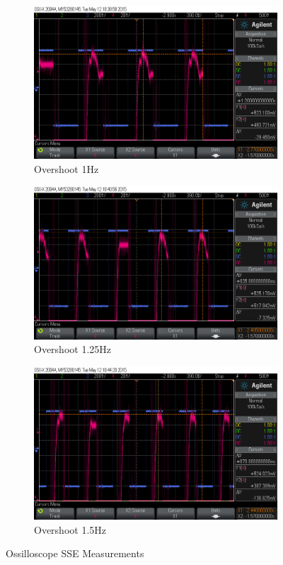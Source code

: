 \documentclass[11pt,a4paper]{article}
\begin{document}
\begin{enumerate}
\begin{figure}[H]
  \begin{subfigure}{0.5\textwidth}
  \includegraphics[width=0.95\linewidth]{Ossilloscope/PartD_1_0Hz_Overshoot.png}
  \caption{Overshoot 1Hz}
  \label{fig:subim2}
  \end{subfigure}
  \begin{subfigure}{0.5\textwidth}
  \includegraphics[width=0.95\linewidth]{Ossilloscope/PartD_1_25Hz_Overshoot.png}
  \caption{Overshoot 1.25Hz}
  \label{fig:subim2}
  \end{subfigure}

  \begin{subfigure}{0.5\textwidth}
  \includegraphics[width=0.95\linewidth]{Ossilloscope/PartD_1_50Hz_Overshoot.png}
  \caption{Overshoot 1.5Hz}
  \label{fig:subim2}
  \end{subfigure}
\caption{\label{fig:freqimpact}Ossilloscope SSE Measurements}
\end{figure}


\end{enumerate}
\end{document}
